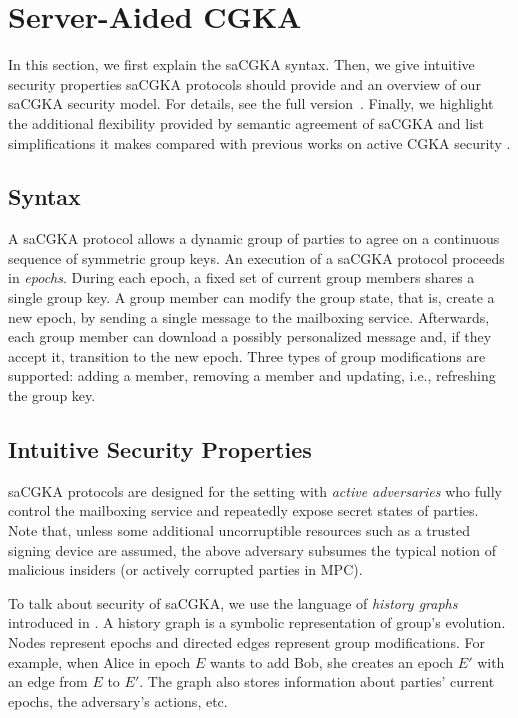 
\section{Server-Aided CGKA}\label{sec:cgka}
In this section, we first explain the saCGKA syntax. Then, we give intuitive security properties saCGKA protocols should provide and an overview of our saCGKA
security model. For details, see the full version~\cite{EPRINT:AHKM21}. Finally, we highlight the additional flexibility provided by semantic agreement of saCGKA and list simplifications it makes compared with previous works on active CGKA security \cite{TCC:ACJM20,EPRINT:AlwJosMul20,hashimoto2021cmpke}.

\subsection{Syntax}
A saCGKA protocol allows a dynamic group of parties to agree on a continuous sequence of symmetric group keys. An execution of a saCGKA protocol proceeds in \emph{epochs}. During each epoch, a fixed set of current group members shares a single group key. A group member can modify the group state, that is, create a new epoch, by sending a single message to the mailboxing service. Afterwards, each group member can download a possibly personalized message and, if they accept it, transition to the new epoch. Three types of group modifications are supported: adding a member, removing a member and updating, i.e., refreshing the group key.

\subsection{Intuitive Security Properties}
saCGKA protocols are designed for the setting with \emph{active adversaries} who fully control the mailboxing service and repeatedly expose secret states of parties. Note that, unless some additional uncorruptible resources such as a trusted signing device are assumed, the above adversary subsumes the typical notion of malicious insiders (or actively corrupted parties in MPC).

To talk about security of saCGKA, we use the language of \emph{history
graphs} introduced in \cite{CCS:ACDT21}. A history graph is a symbolic
representation of group's evolution. Nodes represent epochs and
directed edges represent group modifications. For example, when
Alice in epoch $E$ wants to add Bob, she creates an epoch $E'$ with an edge
from $E$ to $E'$. The graph also stores information about parties' current
epochs, the adversary's actions, etc.

